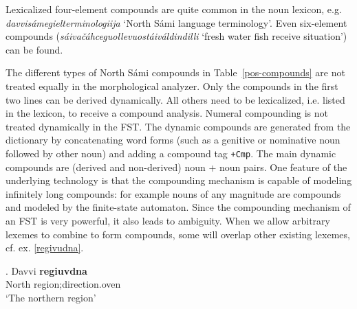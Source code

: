 \documentclass[free]{flammie}
\begin{document}
Lexicalized four-element compounds are quite common in the noun lexicon,
e.g. \textit{davvisámegielterminologiija} `North Sámi language
terminology'.
Even six-element compounds (\textit{sáiva\-čáhce\-guolle\-vuostáiváldindilli} `fresh water fish receive situation') %
can be found.


The different types of North Sámi
compounds in Table~\ref{pos-compounds} are not treated equally in the
morphological analyzer. Only the compounds in the first two lines can
be derived dynamically.
All others need to be lexicalized, i.e. listed in the lexicon, to receive a compound analysis. %
Numeral compounding is not treated dynamically in the FST.
The dynamic compounds are generated from the dictionary by concatenating
word forms (such as a genitive or nominative noun
followed by other noun) and adding a compound tag \texttt{+Cmp}. The
main dynamic compounds are (derived and non-derived) noun + noun
pairs. %
One feature of the underlying technology is that the compounding mechanism is
capable of modeling infinitely long compounds: for example nouns of
any magnitude are compounds and modeled by the finite-state
automaton. Since the compounding mechanism of an FST is very powerful, it
also leads to ambiguity. When we allow arbitrary lexemes to combine
to form compounds, some will overlap other existing lexemes, cf. ex. \ref{regivudna}.

\exg. Davvi \textbf{regiuvdna}\label{regivudna}\\ %
North region;direction.oven\\ %
`The northern region'%
\end{document}
